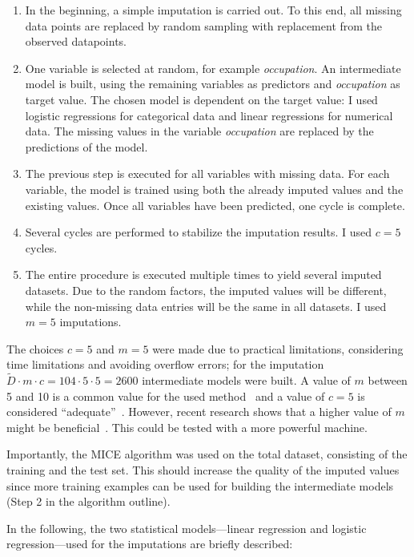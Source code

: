 \documentclass[a4paper,11pt]{article}
\begin{document}
\begin{enumerate}
\item In the beginning, a simple imputation is carried out. To
  this end, all missing data points are replaced by random sampling
  with replacement from the observed datapoints.
\item One variable is selected at random, for example
  \emph{occupation}. An intermediate model is built, using the
  remaining variables as predictors and \emph{occupation} as target
  value. The chosen model is dependent on the target value: I used
  logistic regressions for categorical data and linear regressions for
  numerical data. The missing values in the variable \emph{occupation}
  are replaced by the predictions of the model.
\item The previous step is executed for all variables with missing
  data. For each variable, the model is trained using both the already
  imputed values and the existing values. Once all variables have been
  predicted, one cycle is complete.
\item Several cycles are performed to stabilize the imputation
  results. I used $c = 5$ cycles.
\item The entire procedure is executed multiple times to yield
  several imputed datasets. Due to the random factors, the imputed
  values will be different, while the non-missing data entries will be
  the same in all datasets. I used $m = 5$ imputations.
\end{enumerate}
The choices $c = 5$ and $m = 5$ were made due to practical
limitations, considering time limitations and avoiding overflow
errors; for the imputation
$\tilde{D} \cdot m \cdot c = 104 \cdot 5 \cdot 5 = 2600$ intermediate
models were built. A value of $m$ between 5 and 10 is a common value
for the used method~\cite{royston2011multiple} and a value of $c = 5$
is considered ``adequate''~\cite{van1999multiple}. However, recent
research shows that a higher value of $m$ might be
beneficial~\cite{white2011multiple}. This could be tested with a more
powerful machine.

Importantly, the MICE algorithm was used on the total dataset,
consisting of the training and the test set. This should increase the
quality of the imputed values since more training examples can be used
for building the intermediate models (Step 2 in the algorithm
outline).

In the following, the two statistical models---linear regression and
logistic regression---used for the imputations are briefly described:
\end{document}

